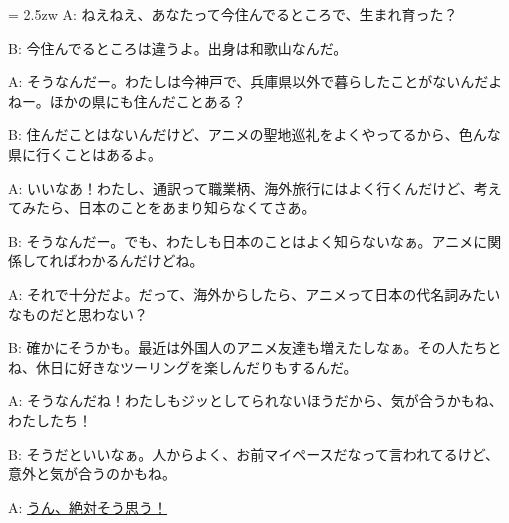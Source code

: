 \documentclass[11pt]{amsart}
\title{}
\author{}
\newenvironment{hangall}[1]{\hangindent = 2.5zw\everypar{\hangindent = 2.5zw}}{}
\begin{document}
\maketitle
\begin{hangall}{}%
A: ねえねえ、あなたって今住んでるところで、生まれ育った？

B: 今住んでるところは違うよ。出身は和歌山なんだ。

A: そうなんだー。わたしは今神戸で、兵庫県以外で暮らしたことがないんだよねー。ほかの県にも住んだことある？

B: 住んだことはないんだけど、アニメの聖地巡礼をよくやってるから、色んな県に行くことはあるよ。

A: いいなあ！わたし、通訳って職業柄、海外旅行にはよく行くんだけど、考えてみたら、日本のことをあまり知らなくてさあ。

B: そうなんだー。でも、わたしも日本のことはよく知らないなぁ。アニメに関係してればわかるんだけどね。

A: それで十分だよ。だって、海外からしたら、アニメって日本の代名詞みたいなものだと思わない？

B: 確かにそうかも。最近は外国人のアニメ友達も増えたしなぁ。その人たちとね、休日に好きなツーリングを楽しんだりもするんだ。

A: そうなんだね！わたしもジッとしてられないほうだから、気が合うかもね、わたしたち！

B: そうだといいなぁ。人からよく、お前マイペースだなって言われてるけど、意外と気が合うのかもね。

A: \ul{うん、絶対そう思う！}\end{hangall}
\end{document}
